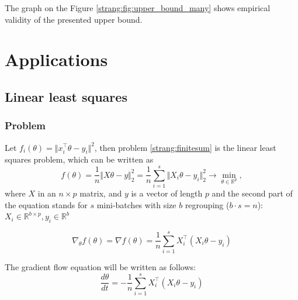\documentclass{article} %
\begin{document}
The graph on the Figure \ref{strang:fig:upper_bound_many} shows empirical validity of the presented upper bound.



\section{Applications}
\subsection{Linear least squares}
\subsubsection{Problem}
Let $f_i(\theta) = \Vert x_i^{\top} \theta - y_i \Vert^2$, then problem \eqref{strang:finitesum} is the linear least squares problem, which can be written as
\begin{equation}\label{strang:LLS}
   f(\theta) = \dfrac{1}{n}\Vert X \theta - y \Vert_2^2  = \dfrac{1}{n}\sum\limits_{i=1}^s\Vert X_i \theta - y_i \Vert_2^2\to \min_{\theta \in \mathbb{R}^p},
\end{equation}
where $X$ in an $n \times p$ matrix, and $y$ is a vector of length $p$ and the second part of the equation stands for $s$ mini-batches with size $b$ regrouping ($b \cdot s = n$): $X_i \in \mathbb{R}^{b \times p}, y_i \in \mathbb{R}^{b}$

\begin{equation}\label{strang:LLS_grad}
\nabla_\theta f(\theta) = \nabla f(\theta) = \dfrac{1}{n}\sum\limits_{i=1}^s X_i^\top( X_i \theta - y_i)
\end{equation}

The gradient flow equation will be written as follows:
\begin{equation}\label{strang:LLS_GF}
\dfrac{d \theta}{d t} = - \dfrac{1}{n}\sum\limits_{i=1}^s X_i^\top( X_i \theta - y_i)
\end{equation}
\end{document}
